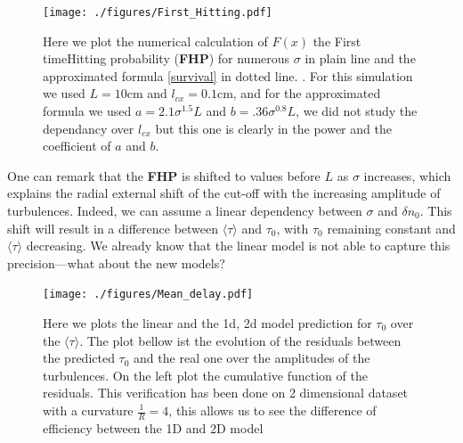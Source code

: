\documentclass[11pt,openany]{report}
\begin{document}
\begin{multicols}{2}
    \begin{figure}[H]
        \centering
        \texttt{[image: ./figures/First\_Hitting.pdf]}
        \label{fig:FHP}
        \caption{Here we plot the numerical calculation of $F(x)$ the First timeHitting probability (\textbf{FHP}) for numerous $\sigma$ in plain line  and the approximated formula \eqref{survival} in dotted line. . For this simulation we used $L = 10$cm and $l_{cx} = 0.1$cm, and for the approximated formula we used $a = 2.1 \sigma^{1.5}L$ and $b = .36\sigma^{0.8} L$, we did not study the dependancy over $l_{cx}$ but this one is clearly in the power and the coefficient of $a$ and $b$.}
    \end{figure}One can remark that the \textbf{FHP} is shifted to values before \( L \) as \( \sigma \) increases, which explains the radial external shift of the cut-off with the increasing amplitude of turbulences. Indeed, we can assume a linear dependency between \( \sigma \) and \( \delta n_0 \). This shift will result in a difference between \( \langle \tau \rangle \) and \( \tau_0 \), with \( \tau_0 \) remaining constant and \( \langle \tau \rangle \) decreasing. We already know that the linear model is not able to capture this precision—what about the new models?
    \begin{figure}[H]
        \centering
        \hspace*{-1.4cm}\texttt{[image: ./figures/Mean\_delay.pdf]}
        \caption{Here we plots the linear and the 1d, 2d model prediction for $\tau_0$ over the $\langle \tau \rangle$. The plot bellow ist the evolution of the residuals between the predicted $\tau_0$ and the real one over the amplitudes of the turbulences. On the left plot the cumulative function of the residuals. This verification has been done on 2 dimensional dataset with a curvature $\frac{1}{R} = 4$, this allows us to see the difference of efficiency between the 1D and 2D model}
        \label{fig:mean_delay}
    \end{figure}


\end{multicols}
\end{document}
